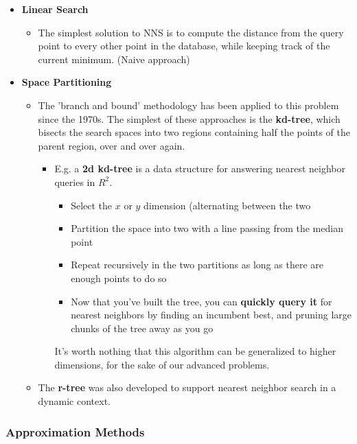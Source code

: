 \documentclass[english, 10pt]{article}
\begin{document}
\begin{itemize}
	\item \textbf{Linear Search}
	\begin{itemize}
		\item The simplest solution to NNS is to compute the distance from the query point to every other point in the database, while keeping track of the current minimum. (Naive approach)
	\end{itemize}
	\item \textbf{Space Partitioning}
	\begin{itemize}
		\item The 'branch and bound' methodology has been applied to this problem since the 1970s. The simplest of these approaches is the \textbf{kd-tree}, which bisects the search spaces into two regions containing half the points of the parent region, over and over again.
		\begin{itemize}
			\item E.g. a \textbf{2d kd-tree} is a data structure for answering nearest neighbor queries in $R^2$.
			\begin{myproof}
				\begin{itemize}
					\item Select the $x$ or $y$ dimension (alternating between the two
					\item Partition the space into two with a line passing from the median point
					\item Repeat recursively in the two partitions as long as there are enough points to do so
					\item Now that you've built the tree, you can \textbf{quickly query it} for nearest neighbors by finding an incumbent best, and pruning large chunks of the tree away as you go
				\end{itemize}
				
				\hfill \break It's worth nothing that this algorithm can be generalized to higher dimensions, for the sake of our advanced problems.
			\end{myproof} 
		\end{itemize}
		\item The \textbf{r-tree} was also developed to support nearest neighbor search in a dynamic context.
	\end{itemize}
\end{itemize}

\subsubsection{Approximation Methods}
\end{document}
